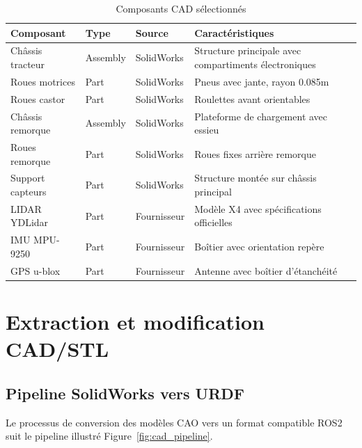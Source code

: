 \documentclass[a4paper,12pt]{report}
\begin{document}
\begin{table}[htbp]
\centering
\caption{Composants CAD sélectionnés}
\begin{tabular}{@{}lllp{6cm}@{}}
\toprule
\textbf{Composant} & \textbf{Type} & \textbf{Source} & \textbf{Caractéristiques} \\
\midrule
Châssis tracteur & Assembly & SolidWorks & Structure principale avec compartiments électroniques \\
Roues motrices & Part & SolidWorks & Pneus avec jante, rayon 0.085m \\
Roues castor & Part & SolidWorks & Roulettes avant orientables \\
Châssis remorque & Assembly & SolidWorks & Plateforme de chargement avec essieu \\
Roues remorque & Part & SolidWorks & Roues fixes arrière remorque \\
Support capteurs & Part & SolidWorks & Structure montée sur châssis principal \\
LIDAR YDLidar & Part & Fournisseur & Modèle X4 avec spécifications officielles \\
IMU MPU-9250 & Part & Fournisseur & Boîtier avec orientation repère \\
GPS u-blox & Part & Fournisseur & Antenne avec boîtier d'étanchéité \\
\bottomrule
\end{tabular}
\end{table}

\section{Extraction et modification CAD/STL}

\subsection{Pipeline SolidWorks vers URDF}

Le processus de conversion des modèles CAO vers un format compatible ROS2 suit le pipeline illustré Figure~\ref{fig:cad_pipeline}.
\end{document}
